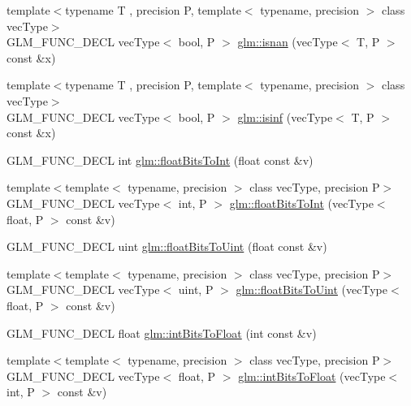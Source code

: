 \begin{DoxyCompactItemize}
\item 
{\footnotesize template$<$typename T , precision P, template$<$ typename, precision $>$ class vec\-Type$>$ }\\G\-L\-M\-\_\-\-F\-U\-N\-C\-\_\-\-D\-E\-C\-L vec\-Type$<$ bool, P $>$ \hyperlink{group__core__func__common_ga6cb8f202a52eed2331724a3800198ebf}{glm\-::isnan} (vec\-Type$<$ T, P $>$ const \&x)
\item 
{\footnotesize template$<$typename T , precision P, template$<$ typename, precision $>$ class vec\-Type$>$ }\\G\-L\-M\-\_\-\-F\-U\-N\-C\-\_\-\-D\-E\-C\-L vec\-Type$<$ bool, P $>$ \hyperlink{group__core__func__common_gaf28f7a4696746f081685c9fd05c7e2de}{glm\-::isinf} (vec\-Type$<$ T, P $>$ const \&x)
\item 
G\-L\-M\-\_\-\-F\-U\-N\-C\-\_\-\-D\-E\-C\-L int \hyperlink{group__core__func__common_gadc6a536a7bef046c3293d2ccad6d9ca2}{glm\-::float\-Bits\-To\-Int} (float const \&v)
\item 
{\footnotesize template$<$template$<$ typename, precision $>$ class vec\-Type, precision P$>$ }\\G\-L\-M\-\_\-\-F\-U\-N\-C\-\_\-\-D\-E\-C\-L vec\-Type$<$ int, P $>$ \hyperlink{group__core__func__common_gac4a0710238ae54c67931dd29a0b0f873}{glm\-::float\-Bits\-To\-Int} (vec\-Type$<$ float, P $>$ const \&v)
\item 
G\-L\-M\-\_\-\-F\-U\-N\-C\-\_\-\-D\-E\-C\-L uint \hyperlink{group__core__func__common_ga748b4d2819b48d28ca09dc8733488873}{glm\-::float\-Bits\-To\-Uint} (float const \&v)
\item 
{\footnotesize template$<$template$<$ typename, precision $>$ class vec\-Type, precision P$>$ }\\G\-L\-M\-\_\-\-F\-U\-N\-C\-\_\-\-D\-E\-C\-L vec\-Type$<$ uint, P $>$ \hyperlink{group__core__func__common_ga1804d4c443605d8a27be644aa461afe4}{glm\-::float\-Bits\-To\-Uint} (vec\-Type$<$ float, P $>$ const \&v)
\item 
G\-L\-M\-\_\-\-F\-U\-N\-C\-\_\-\-D\-E\-C\-L float \hyperlink{group__core__func__common_ga2650dc57b2148a6ffbce20944fb4d97a}{glm\-::int\-Bits\-To\-Float} (int const \&v)
\item 
{\footnotesize template$<$template$<$ typename, precision $>$ class vec\-Type, precision P$>$ }\\G\-L\-M\-\_\-\-F\-U\-N\-C\-\_\-\-D\-E\-C\-L vec\-Type$<$ float, P $>$ \hyperlink{group__core__func__common_gad21ab176dd0e6b59d923db5efca87f4e}{glm\-::int\-Bits\-To\-Float} (vec\-Type$<$ int, P $>$ const \&v)
\item 

\end{DoxyCompactItemize}
